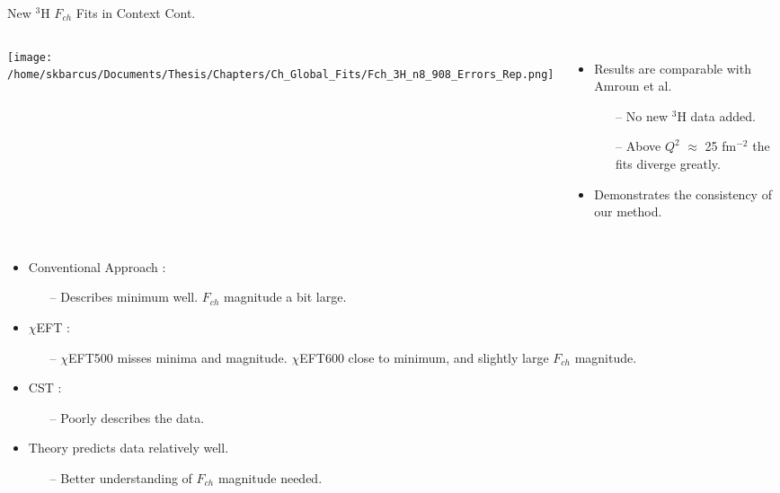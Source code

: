 \documentclass[10pt]{beamer}
\begin{document}
\begin{frame}[fragile]{New $^3$H $F_{ch}$ Fits in Context Cont.}

	\begin{columns}[T,onlytextwidth]  
	
	\begin{center}
	\texttt{[image: /home/skbarcus/Documents/Thesis/Chapters/Ch\_Global\_Fits/Fch\_3H\_n8\_908\_Errors\_Rep.png]}
	\end{center}
	
	
	\begin{itemize}
		\item \alert{Results are comparable} with Amroun et al.
		\begin{itemize}
			\item[--] No new $^3$H data added.
			\item[--] \alert{Above $Q^2$ $\approx$ 25 fm$^{-2}$ the fits diverge greatly}. 
		\end{itemize}		 
		\item Demonstrates the consistency of our method.
	\end{itemize}
	
	\end{columns}
	
	\begin{itemize}
		\pause
		\item \alert{Conventional Approach} \cite{Article:Marcucci}:
			\begin{itemize}
				\item[--] \alert{Describes minimum well}. \alert{$F_{ch}$ magnitude a bit large}.
			\end{itemize}
		\pause
		\item \alert{$\chi$EFT} \cite{Article:Marcucci}:
			\begin{itemize}
				\item[--] \alert{$\chi$EFT500 misses minima and magnitude}. \alert{$\chi$EFT600 close to minimum}, and \alert{slightly large $F_{ch}$ magnitude}.
			\end{itemize}
		\pause
		\item \alert{CST} \cite{Article:Marcucci}:
			\begin{itemize}
				\item[--] \alert{Poorly describes the data}.
			\end{itemize}
		\pause
		\item \alert{Theory predicts data relatively well}.
			\begin{itemize}
				\item[--] \alert{Better understanding of $F_{ch}$ magnitude needed}.
			\end{itemize}
	\end{itemize}

\end{frame}
\end{document}
